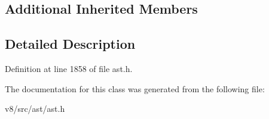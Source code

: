 \subsection*{Additional Inherited Members}


\subsection{Detailed Description}


Definition at line 1858 of file ast.\+h.



The documentation for this class was generated from the following file\+:\begin{DoxyCompactItemize}
\item 
v8/src/ast/ast.\+h\end{DoxyCompactItemize}
